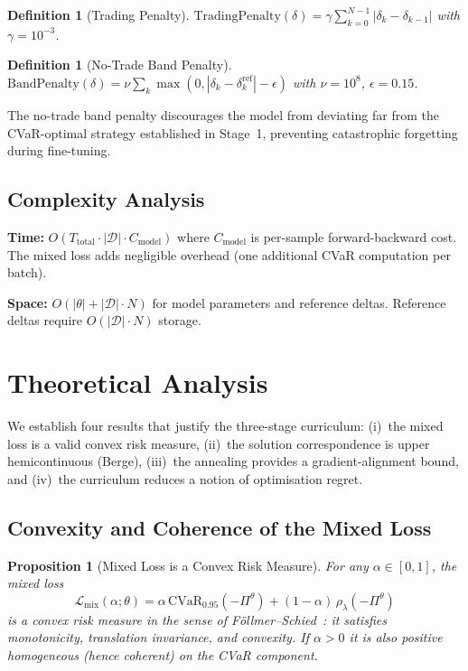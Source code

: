 \documentclass[11pt]{article}
\newtheorem{proposition}[theorem]{Proposition}
\newtheorem{definition}[theorem]{Definition}
\newcommand{\cvar}{\mathrm{CVaR}}
\begin{document}
\begin{definition}[Trading Penalty]
$\mathrm{TradingPenalty}(\delta) = \gamma \sum_{k=0}^{N-1} |\delta_k - \delta_{k-1}|$ with $\gamma = 10^{-3}$.
\end{definition}

\begin{definition}[No-Trade Band Penalty]
$\mathrm{BandPenalty}(\delta) = \nu \sum_k \max(0, |\delta_k - \delta_k^{\text{ref}}| - \epsilon)$ with $\nu = 10^8$, $\epsilon = 0.15$.
\end{definition}

The no-trade band penalty discourages the model from deviating far from the CVaR-optimal strategy established in Stage~1, preventing catastrophic forgetting during fine-tuning.

\subsection{Complexity Analysis}

\textbf{Time:} $O(T_{\text{total}} \cdot |\mathcal{D}| \cdot C_{\text{model}})$ where $C_{\text{model}}$ is per-sample forward-backward cost. The mixed loss adds negligible overhead (one additional CVaR computation per batch).

\textbf{Space:} $O(|\theta| + |\mathcal{D}| \cdot N)$ for model parameters and reference deltas. Reference deltas require $O(|\mathcal{D}| \cdot N)$ storage.

\section{Theoretical Analysis}
\label{sec:theory}

We establish four results that justify the three-stage curriculum: (i)~the mixed loss is a valid convex risk measure, (ii)~the solution correspondence is upper hemicontinuous (Berge), (iii)~the annealing provides a gradient-alignment bound, and (iv)~the curriculum reduces a notion of optimisation regret.

\subsection{Convexity and Coherence of the Mixed Loss}

\begin{proposition}[Mixed Loss is a Convex Risk Measure]
\label{prop:continuity}
For any $\alpha\in[0,1]$, the mixed loss
\[
    \mathcal{L}_{\mathrm{mix}}(\alpha;\theta) = \alpha\,\cvar_{0.95}\!(-\Pi^\theta) + (1-\alpha)\,\rho_\lambda(-\Pi^\theta)
\]
is a convex risk measure in the sense of F\"ollmer--Schied~\citep{follmer2002convex}: it satisfies monotonicity, translation invariance, and convexity.  If $\alpha > 0$ it is also positive homogeneous (hence coherent) on the CVaR component.
\end{proposition}
\end{document}
